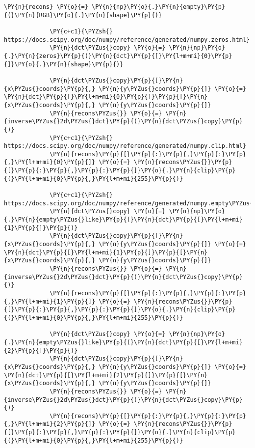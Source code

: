\begin{Verbatim}[commandchars=\\\{\}]
             \PY{n}{recons} \PY{o}{=} \PY{n}{np}\PY{o}{.}\PY{n}{empty}\PY{p}{(}\PY{n}{RGB}\PY{o}{.}\PY{n}{shape}\PY{p}{)}
             
             \PY{c+c1}{\PYZsh{} https://docs.scipy.org/doc/numpy/reference/generated/numpy.zeros.html}
             \PY{n}{dct\PYZus{}copy} \PY{o}{=} \PY{n}{np}\PY{o}{.}\PY{n}{zeros}\PY{p}{(}\PY{n}{dct}\PY{p}{[}\PY{l+m+mi}{0}\PY{p}{]}\PY{o}{.}\PY{n}{shape}\PY{p}{)}
         
             \PY{n}{dct\PYZus{}copy}\PY{p}{[}\PY{n}{x\PYZus{}coords}\PY{p}{,} \PY{n}{y\PYZus{}coords}\PY{p}{]} \PY{o}{=} \PY{n}{dct}\PY{p}{[}\PY{l+m+mi}{0}\PY{p}{]}\PY{p}{[}\PY{n}{x\PYZus{}coords}\PY{p}{,} \PY{n}{y\PYZus{}coords}\PY{p}{]}
             \PY{n}{recons\PYZus{}} \PY{o}{=} \PY{n}{inverse\PYZus{}2d\PYZus{}dct}\PY{p}{(}\PY{n}{dct\PYZus{}copy}\PY{p}{)}
             \PY{c+c1}{\PYZsh{} https://docs.scipy.org/doc/numpy/reference/generated/numpy.clip.html}
             \PY{n}{recons}\PY{p}{[}\PY{p}{:}\PY{p}{,}\PY{p}{:}\PY{p}{,}\PY{l+m+mi}{0}\PY{p}{]} \PY{o}{=} \PY{n}{recons\PYZus{}}\PY{p}{[}\PY{p}{:}\PY{p}{,}\PY{p}{:}\PY{p}{]}\PY{o}{.}\PY{n}{clip}\PY{p}{(}\PY{l+m+mi}{0}\PY{p}{,}\PY{l+m+mi}{255}\PY{p}{)}
             
             \PY{c+c1}{\PYZsh{} https://docs.scipy.org/doc/numpy/reference/generated/numpy.empty\PYZus{}like.html}
             \PY{n}{dct\PYZus{}copy} \PY{o}{=} \PY{n}{np}\PY{o}{.}\PY{n}{empty\PYZus{}like}\PY{p}{(}\PY{n}{dct}\PY{p}{[}\PY{l+m+mi}{1}\PY{p}{]}\PY{p}{)}
             \PY{n}{dct\PYZus{}copy}\PY{p}{[}\PY{n}{x\PYZus{}coords}\PY{p}{,} \PY{n}{y\PYZus{}coords}\PY{p}{]} \PY{o}{=} \PY{n}{dct}\PY{p}{[}\PY{l+m+mi}{1}\PY{p}{]}\PY{p}{[}\PY{n}{x\PYZus{}coords}\PY{p}{,} \PY{n}{y\PYZus{}coords}\PY{p}{]}
             \PY{n}{recons\PYZus{}} \PY{o}{=} \PY{n}{inverse\PYZus{}2d\PYZus{}dct}\PY{p}{(}\PY{n}{dct\PYZus{}copy}\PY{p}{)}
             \PY{n}{recons}\PY{p}{[}\PY{p}{:}\PY{p}{,}\PY{p}{:}\PY{p}{,}\PY{l+m+mi}{1}\PY{p}{]} \PY{o}{=} \PY{n}{recons\PYZus{}}\PY{p}{[}\PY{p}{:}\PY{p}{,}\PY{p}{:}\PY{p}{]}\PY{o}{.}\PY{n}{clip}\PY{p}{(}\PY{l+m+mi}{0}\PY{p}{,}\PY{l+m+mi}{255}\PY{p}{)}
         
             \PY{n}{dct\PYZus{}copy} \PY{o}{=} \PY{n}{np}\PY{o}{.}\PY{n}{empty\PYZus{}like}\PY{p}{(}\PY{n}{dct}\PY{p}{[}\PY{l+m+mi}{2}\PY{p}{]}\PY{p}{)}
             \PY{n}{dct\PYZus{}copy}\PY{p}{[}\PY{n}{x\PYZus{}coords}\PY{p}{,} \PY{n}{y\PYZus{}coords}\PY{p}{]} \PY{o}{=} \PY{n}{dct}\PY{p}{[}\PY{l+m+mi}{2}\PY{p}{]}\PY{p}{[}\PY{n}{x\PYZus{}coords}\PY{p}{,} \PY{n}{y\PYZus{}coords}\PY{p}{]}
             \PY{n}{recons\PYZus{}} \PY{o}{=} \PY{n}{inverse\PYZus{}2d\PYZus{}dct}\PY{p}{(}\PY{n}{dct\PYZus{}copy}\PY{p}{)}
             \PY{n}{recons}\PY{p}{[}\PY{p}{:}\PY{p}{,}\PY{p}{:}\PY{p}{,}\PY{l+m+mi}{2}\PY{p}{]} \PY{o}{=} \PY{n}{recons\PYZus{}}\PY{p}{[}\PY{p}{:}\PY{p}{,}\PY{p}{:}\PY{p}{]}\PY{o}{.}\PY{n}{clip}\PY{p}{(}\PY{l+m+mi}{0}\PY{p}{,}\PY{l+m+mi}{255}\PY{p}{)}
             

\end{Verbatim}
